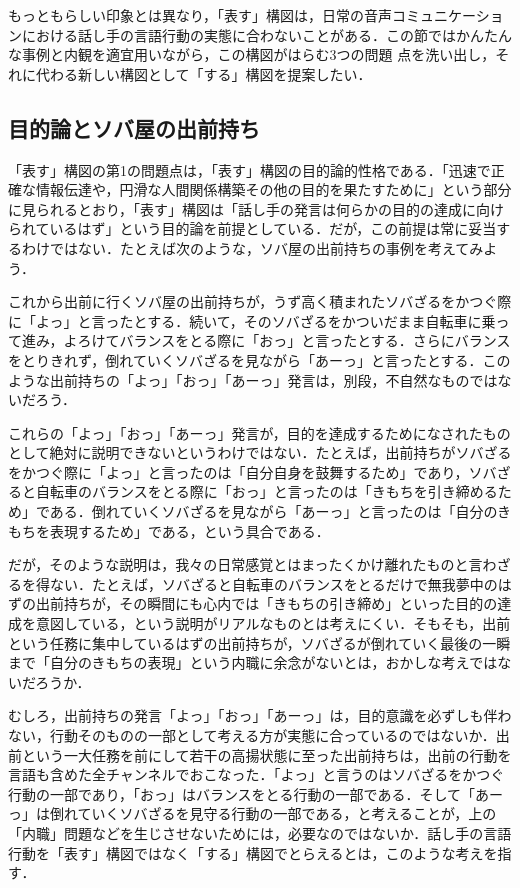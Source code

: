 \documentclass[japanese]{jnlp_1.3b}
\begin{document}
もっともらしい印象とは異なり，「表す」構図は，日常の音声コミュニケーションにおける話し手の言語行動の実態に合わないことがある．この節ではかんたんな事例と内観を適宜用いながら，この構図がはらむ3つの問題
点を洗い出し，それに代わる新しい構図として「する」構図を提案したい．


\subsection{目的論とソバ屋の出前持ち}

「表す」構図の第1の問題点は，「表す」構図の目的論的性格である．「迅速で正確な情報伝達や，円滑な人間関係構築その他の目的を果たすために」という部分に見られるとおり，「表す」構図は「話し手の発言は何らかの目的の達成に向けられているはず」という目的論を前提としている．だが，この前提は常に妥当するわけではない．たとえば次のような，ソバ屋の出前持ちの事例を考えてみよう．

これから出前に行くソバ屋の出前持ちが，うず高く積まれたソバざるをかつぐ際に「よっ」と言ったとする．続いて，そのソバざるをかついだまま自転車に乗って進み，よろけてバランスをとる際に「おっ」と言ったとする．さらにバランスをとりきれず，倒れていくソバざるを見ながら「あーっ」と言ったとする．このような出前持ちの「よっ」「おっ」「あーっ」発言は，別段，不自然なものではないだろう．

これらの「よっ」「おっ」「あーっ」発言が，目的を達成するためになされたものとして絶対に説明できないというわけではない．たとえば，出前持ちがソバざるをかつぐ際に「よっ」と言ったのは「自分自身を鼓舞するため」であり，ソバざると自転車のバランスをとる際に「おっ」と言ったのは「きもちを引き締めるため」である．倒れていくソバざるを見ながら「あーっ」と言ったのは「自分のきもちを表現するため」である，という具合である．

だが，そのような説明は，我々の日常感覚とはまったくかけ離れたものと言わざるを得ない．たとえば，ソバざると自転車のバランスをとるだけで無我夢中のはずの出前持ちが，その瞬間にも心内では「きもちの引き締め」といった目的の達成を意図している，という説明がリアルなものとは考えにくい．そもそも，出前という任務に集中しているはずの出前持ちが，ソバざるが倒れていく最後の一瞬まで「自分のきもちの表現」という内職に余念がないとは，おかしな考えではないだろうか．

むしろ，出前持ちの発言「よっ」「おっ」「あーっ」は，目的意識を必ずしも伴わない，行動そのものの一部として考える方が実態に合っているのではないか．出前という一大任務を前にして若干の高揚状態に至った出前持ちは，出前の行動を言語も含めた全チャンネルでおこなった．「よっ」と言うのはソバざるをかつぐ行動の一部であり，「おっ」はバランスをとる行動の一部である．そして「あーっ」は倒れていくソバざるを見守る行動の一部である，と考えることが，上の「内職」問題などを生じさせないためには，必要なのではないか．話し手の言語行動を「表す」構図ではなく「する」構図でとらえるとは，このような考えを指す．
\end{document}
